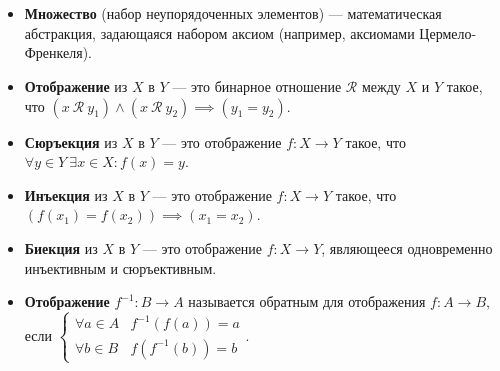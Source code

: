 \documentclass{article}
\begin{document}
\section{\centering}
\noindent{}
\begin{itemize}[leftmargin=*]
    \item \textbf{Множество} (набор неупорядоченных элементов) --- математическая абстракция, задающаяся набором аксиом (например, аксиомами Цермело-Френкеля).
    \item \textbf{Отображение} из \(X\) в \(Y\) --- это бинарное отношение \(\mathcal{R}\) между \(X\) и \(Y\) такое, что \((x\ \mathcal{R}\ y_1) \land (x\ \mathcal{R}\ y_2) \implies (y_1 = y_2)\).
    \item \textbf{Сюръекция} из \(X\) в \(Y\) --- это отображение \(f: X \to Y\) такое, что \(\forall y \in Y\ \exists x \in X: f(x) = y\).
    \item \textbf{Инъекция} из \(X\) в \(Y\) --- это отображение \(f: X \to Y\) такое, что \((f(x_1) = f(x_2)) \implies (x_1 = x_2)\).
    \item \textbf{Биекция} из \(X\) в \(Y\) --- это отображение \(f: X \to Y\), являющееся одновременно инъективным и сюръективным.
    \item \textbf{Отображение} \(f^{-1}: B \to A\) называется обратным для отображения \(f: A \to B\), если \(
    \begin{cases}
        \forall a \in A & f^{-1}(f(a)) = a\\
        \forall b \in B & f(f^{-1}(b)) = b 
    \end{cases}
    \).   
\end{itemize}

\end{document}

